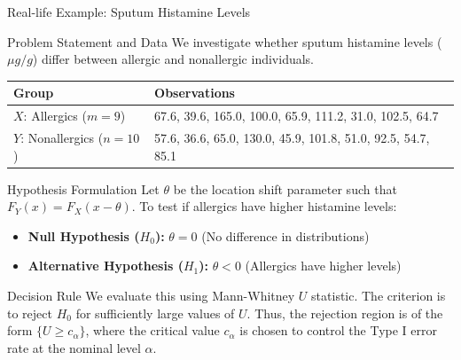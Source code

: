 \documentclass[8pt]{beamer}
\begin{document}
\begin{frame}{Real-life Example: Sputum Histamine Levels}
    \footnotesize

    \begin{block}{Problem Statement and Data}
        We investigate whether sputum histamine levels ($\mu g/g$) differ between allergic and nonallergic individuals.
        \vspace{0.2cm}
        \centering
        \begin{tabular}{lp{7.5cm}}
            \toprule
            \textbf{Group} & \textbf{Observations} \\
            \midrule
            $X$: Allergics ($m=9$) & 67.6, 39.6, 165.0, 100.0, 65.9, 111.2, 31.0, 102.5, 64.7 \\
            $Y$: Nonallergics ($n=10$) & 57.6, 36.6, 65.0, 130.0, 45.9, 101.8, 51.0, 92.5, 54.7, 85.1 \\
            \bottomrule
        \end{tabular}
    \end{block}

    \begin{block}{Hypothesis Formulation}
        Let $\theta$ be the location shift parameter such that $F_Y(x) = F_X(x - \theta)$. To test if allergics have higher histamine levels:
        \begin{itemize}
            \item \textbf{Null Hypothesis ($H_0$):} $\theta = 0$ (No difference in distributions)
            \item \textbf{Alternative Hypothesis ($H_1$):} $\theta < 0$ (Allergics have higher levels)
        \end{itemize}
    \end{block}
    
 \begin{block}{Decision Rule}
    We evaluate this using Mann-Whitney $U$ statistic. The criterion is to reject $H_0$ for sufficiently large values of $U$. Thus, the rejection region is of the form \textbf{$\{U \geq c_\alpha\}$}, where the critical value $c_\alpha$ is chosen to control the Type I error rate at the nominal level $\alpha$.
\end{block}
    
\end{frame}
\end{document}
